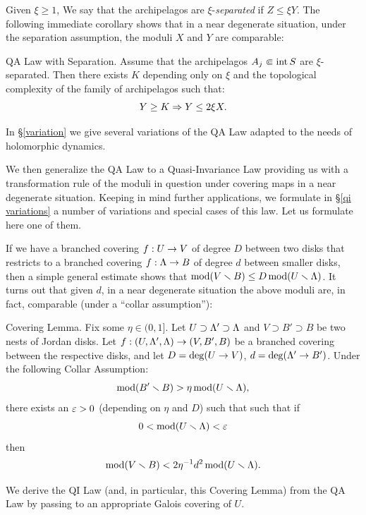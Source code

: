 \ssk  Given $\xi\geq 1$, 
We say  that the archipelagos are $\xi$-{\it separated} if $Z\leq \xi Y$. 
The following immediate corollary shows that in a near degenerate situation,
under the separation assumption,   the moduli $X$ and $Y$ are comparable:

\proclaim QA Law with Separation.
Assume that the archipelagos $A_j\Subset \operatorname{int} S$ 
are $\xi$-separated.
Then there exists $K$ depending only on $\xi$ and the topological complexity of the
family of archipelagos
 such that:
 $$ Y\geq K \Rightarrow Y\leq 2\xi X. $$ 




In \S \ref{variation} we  give several variations of the QA Law adapted to the
needs of  holomorphic dynamics.

\msk
We then generalize the QA Law to a Quasi-Invariance Law 
providing us with a transformation rule of the moduli in question under
covering maps in a near degenerate situation. Keeping in mind further applications,
we formulate in \S \ref{qi variations} a number of variations and special cases of this law.
Let us formulate here one of them. 

If we have a branched covering $f: U \rightarrow V$ of degree $D$  between two disks
that restricts to a branched  covering  $f: {\Lambda}\rightarrow B$ of degree $d$ between smaller disks,
then a simple general estimate shows that $\operatorname{mod}(V\smallsetminus B) \leq D\operatorname{mod}(U\smallsetminus {\Lambda})$.
It turns out that given $d$, in a near degenerate situation 
the above moduli are, in  fact, comparable (under a ``collar assumption''):  

\proclaim Covering Lemma. 
Fix some  $\eta\in (0,1]$. 
 Let $U\supset {\Lambda}'\supset {\Lambda}$ and $V\supset B' \supset B$ be two nests of Jordan disks.
Let $f: (U, {\Lambda}', {\Lambda}) \rightarrow (V, B', B)$ be a branched covering 
between the respective disks,  
 and let $ D  =  \deg(U\rightarrow V)$, $d=\deg({\Lambda}'\rightarrow B')$.
Under the following Collar Assumption:
$$ \operatorname{mod}(B'\smallsetminus B) > \eta \operatorname{mod}(U\smallsetminus {\Lambda}),  $$ 
there exists an ${\varepsilon}>0$ (depending on $\eta$ and $D$) such that such that
if  $$0< \operatorname{mod}(U\smallsetminus {\Lambda}) < {\varepsilon}$$ then 
$$ 
   \operatorname{mod} (V\smallsetminus B)  <  2\eta^{-1} d^2 \operatorname{mod}(U\smallsetminus {\Lambda}).
$$





We derive the QI Law (and, in particular, this Covering Lemma) from the QA Law
by passing to an appropriate Galois covering of $U$.

